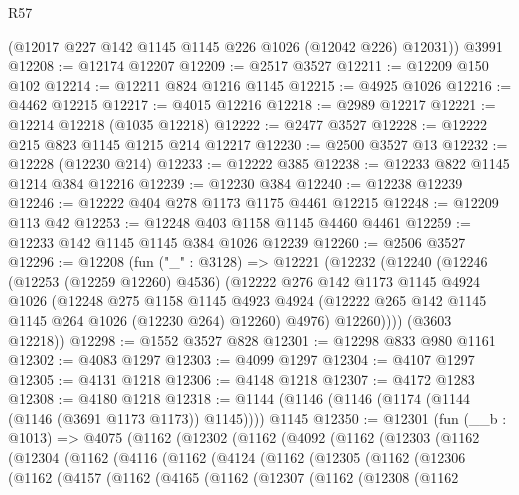 \begin{lexlean}{R57}
\begin{coremodule}
      (@12017 @227 @142 @1145 @1145 @226 @1026 (@12042 @226) @12031))
    @3991
@12208 := @12174 @12207
@12209 := @2517 @3527
@12211 := @12209 @150 @102
@12214 := @12211 @824 @1216 @1145
@12215 := @4925 @1026
@12216 := @4462 @12215
@12217 := @4015 @12216
@12218 := @2989 @12217
@12221 := @12214 @12218 (@1035 @12218)
@12222 := @2477 @3527
@12228 := @12222 @215 @823 @1145 @1215 @214 @12217
@12230 := @2500 @3527 @13
@12232 := @12228 (@12230 @214)
@12233 := @12222 @385
@12238 := @12233 @822 @1145 @1214 @384 @12216
@12239 := @12230 @384
@12240 := @12238 @12239
@12246 := @12222 @404 @278 @1173 @1175 @4461 @12215
@12248 := @12209 @113 @42
@12253 := @12248 @403 @1158 @1145 @4460 @4461
@12259 := @12233 @142 @1145 @1145 @384 @1026 @12239
@12260 := @2506 @3527
@12296 := @12208
    (fun ("_" : @3128) =>
    @12221
      (@12232
        (@12240
          (@12246
            (@12253 (@12259 @12260) @4536)
            (@12222
              @276
              @142
              @1173
              @1145
              @4924
              @1026
              (@12248
                @275
                @1158
                @1145
                @4923
                @4924
                (@12222 @265 @142 @1145 @1145 @264 @1026 (@12230 @264) @12260)
                @4976)
              @12260))))
      (@3603 @12218))
@12298 := @1552 @3527 @828
@12301 := @12298 @833 @980 @1161
@12302 := @4083 @1297
@12303 := @4099 @1297
@12304 := @4107 @1297
@12305 := @4131 @1218
@12306 := @4148 @1218
@12307 := @4172 @1283
@12308 := @4180 @1218
@12318 := @1144 (@1146 (@1146 (@1174 (@1144 (@1146 (@3691 @1173 @1173)) @1145)))) @1145
@12350 := @12301
    (fun (__b : @1013) =>
    @4075
      (@1162
        (@12302
          (@1162
            (@4092
              (@1162
                (@12303
                  (@1162
                    (@12304
                      (@1162
                        (@4116
                          (@1162
                            (@4124
                              (@1162
                                (@12305
                                  (@1162
                                    (@12306
                                      (@1162
                                        (@4157
                                          (@1162
                                            (@4165
                                              (@1162
                                                (@12307
                                                  (@1162
                                                    (@12308
                                                      (@1162

\end{coremodule}
\end{lexlean}
